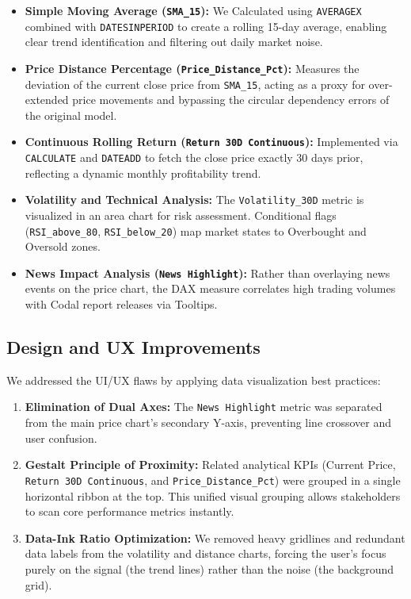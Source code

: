 \documentclass[a4paper,12pt]{extarticle}
\begin{document}
\begin{itemize}
    \item \textbf{Simple Moving Average (\texttt{SMA\_15}):} We Calculated using
    \texttt{AVERAGEX} combined with \texttt{DATESINPERIOD} to create a
    rolling 15-day average, enabling clear trend identification and
    filtering out daily market noise.


    \item \textbf{Price Distance Percentage (\texttt{Price\_Distance\_Pct}):}
    Measures the deviation of the current close price from \texttt{SMA\_15},
    acting as a proxy for over-extended price movements and bypassing the
    circular dependency errors of the original model.

    \item \textbf{Continuous Rolling Return (\texttt{Return 30D Continuous}):}
    Implemented via \texttt{CALCULATE} and \texttt{DATEADD} to fetch the close
    price exactly 30 days prior, reflecting a dynamic monthly profitability
    trend.

    \item \textbf{Volatility and Technical Analysis:} The \texttt{Volatility\_30D}
    metric is visualized in an area chart for risk assessment. Conditional flags
    (\texttt{RSI\_above\_80}, \texttt{RSI\_below\_20}) map market states to
    Overbought and Oversold zones.

    \item \textbf{News Impact Analysis (\texttt{News Highlight}):} Rather than
    overlaying news events on the price chart, the DAX measure correlates high
    trading volumes with Codal report releases via Tooltips.
\end{itemize}


\subsection{Design and UX Improvements}
We addressed the UI/UX flaws by applying data visualization best practices:
\begin{enumerate}
    \item \textbf{Elimination of Dual Axes:} The \texttt{News Highlight} metric was separated from the main price chart's secondary Y-axis, preventing line crossover and user confusion.
    \item \textbf{Gestalt Principle of Proximity:} Related analytical KPIs (Current Price, \texttt{Return 30D Continuous}, and \texttt{Price\_Distance\_Pct}) were grouped in a single horizontal ribbon at the top. This unified visual grouping allows stakeholders to scan core performance metrics instantly.
    \item \textbf{Data-Ink Ratio Optimization:} We removed heavy gridlines and redundant data labels from the volatility and distance charts, forcing the user's focus purely on the signal (the trend lines) rather than the noise (the background grid).
\end{enumerate}
\end{document}
